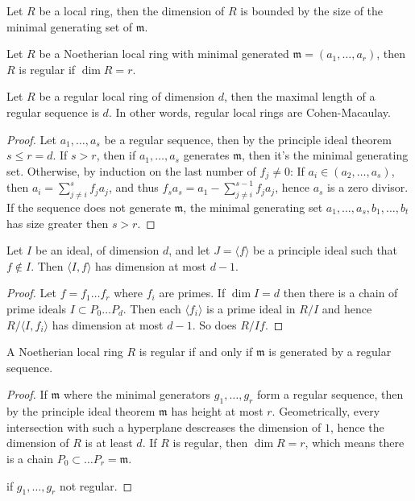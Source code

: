 \begin{corollary}
	Let $R$ be a local ring, then the dimension of $R$ is bounded by the size of the minimal generating set of $\mathfrak{m}$.
\end{corollary}

\begin{definition}
	Let $R$ be a Noetherian local ring with minimal generated $\mathfrak{m} = (a_1, \dots, a_r)$, then $R$ is regular if $\dim R = r$.
\end{definition}

\begin{proposition}
	Let $R$ be a regular local ring of dimension $d$, then the maximal length of a regular sequence is $d$.
	In other words, regular local rings are Cohen-Macaulay.
\end{proposition}
\begin{proof}
	Let $a_1, \dots, a_s$ be a regular sequence, then by the principle ideal theorem $s \leq r = d$.
	If $s > r$, then if $a_1, \dots, a_s$ generates $\mathfrak{m}$, then it's the minimal generating set.
	Otherwise, by induction on the last number of $f_j \neq 0$:
	If $a_i \in (a_2, \dots, a_s)$, then $a_i = \sum_{j\neq i}^{s} f_j a_j$, and thus $f_s a_s = a_1 - \sum_{j\neq i}^{s-1}f_j a_j$, hence $a_s$ is a zero divisor.
	If the sequence does not generate $\mathfrak{m}$, the minimal generating set $a_1, \dots, a_s, b_1, \dots, b_t$ has size greater then $s > r$.
\end{proof}

Let $I$ be an ideal, of dimension $d$, and let $J = \langle f \rangle$ be a principle ideal such that $f \notin I$.
Then $\langle I, f\rangle$ has dimension at most $d - 1$.
\begin{proof}
	Let $f = f_1 \dots f_r$ where $f_i$ are primes.
	If $\dim I = d$ then there is a chain of prime ideals $I \subset P_0 \dots P_d$.
	Then each $\langle f_i \rangle$ is a prime ideal in $R/I$ and hence $R/ \langle I, f_i\rangle$ has dimension at most $d-1$.
	So does $R/If$.
\end{proof}

\begin{proposition}
	A Noetherian local ring $R$ is regular if and only if $\mathfrak{m}$ is generated by a regular sequence.
\end{proposition}
\begin{proof}
	If $\mathfrak{m}$ where the minimal generators $g_1, \dots, g_r$ form a regular sequence, then by the principle ideal theorem $\mathfrak{m}$ has height at most $r$.
	Geometrically, every intersection with such a hyperplane descreases the dimension of $1$, hence the dimension of $R$ is at least $d$.
	If $R$ is regular, then $\dim R = r$, which means there is a chain $P_0 \subset \dots P_r = \mathfrak{m}$.

	if $g_1, \dots, g_r$ not regular.
\end{proof}

